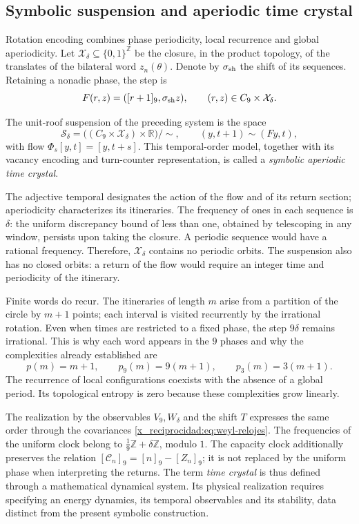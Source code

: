 \subsection{Symbolic suspension and aperiodic time crystal}
\label{x_reciprocidad:mono-ampl:cristal}

Rotation encoding combines phase periodicity, local recurrence
and global aperiodicity. Let \(\mathcal X_\delta\subseteq\{0,1\}^{\mathbb Z}\)
be the closure, in the product topology, of the translates of the
bilateral word \(z_n(\theta)\). Denote by \(\sigma_{\rm sh}\) the
shift of its sequences. Retaining a nonadic phase, the step is
\[
 F(r,z)=([r+1]_9,\sigma_{\rm sh}z),\qquad
 (r,z)\in C_9\times\mathcal X_\delta.
\]

\begin{definition}
\label{x_reciprocidad:mono-ampl:def-cristal}
The unit-roof suspension of the preceding system is the space
\[
 \mathcal S_\delta=
 \bigl((C_9\times\mathcal X_\delta)\times\mathbb R\bigr)/\sim,
 \qquad (y,t+1)\sim(Fy,t),
\]
with flow \(\Phi_s[y,t]=[y,t+s]\). This temporal-order model, together with its
vacancy encoding and turn-counter representation, is called a \emph{symbolic
aperiodic time crystal}.
\end{definition}

The adjective temporal designates the action of the flow and of its return section;
aperiodicity characterizes its itineraries. The frequency of ones in each
sequence is \(\delta\): the uniform discrepancy bound of less than one,
obtained by telescoping in any window, persists upon taking the closure.
A periodic sequence would have a rational frequency. Therefore,
\(\mathcal X_\delta\) contains no periodic orbits. The suspension
also has no closed orbits: a return of the flow would require an integer
time and periodicity of the itinerary.

Finite words do recur. The itineraries of length \(m\)
arise from a partition of the circle by \(m+1\) points; each
interval is visited recurrently by the irrational rotation. Even
when times are restricted to a fixed phase, the step \(9\delta\) remains
irrational. This is why each word appears in the
\(9\) phases and why the complexities already established are
\[
 p(m)=m+1,\qquad p_9(m)=9(m+1),\qquad p_3(m)=3(m+1).
\]
The recurrence of local configurations coexists with the absence of a
global period. Its topological entropy is zero because these complexities
grow linearly.

The realization by the observables \(V_9,W_\delta\) and the shift
\(T\) expresses the same order through the covariances
\eqref{x_reciprocidad:eq:weyl-relojes}. The frequencies of the uniform clock belong to
\(\frac19\mathbb Z+\delta\mathbb Z\), modulo \(1\). The capacity
clock additionally preserves the relation
\([\mathcal C_n]_9=[n]_9-[Z_n]_9\); it is not replaced by the uniform phase
when interpreting the returns. The term \emph{time crystal} is thus
defined through a mathematical dynamical system. Its physical realization
requires specifying an energy dynamics, its temporal observables
and its stability, data distinct from the present symbolic construction.

